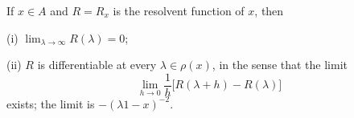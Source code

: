 If $x \in A$ and $R = R_x$ is the resolvent function of $x$, then

(i) $\displaystyle\lim_{\lambda \to \infty} R(\lambda) = 0$;

(ii) $R$ is differentiable at every $\lambda \in \rho(x)$, in the sense that the limit
$$\lim_{h \to 0} \frac{1}{h}\bigl[R(\lambda + h) - R(\lambda)\bigr]$$
exists; the limit is $-(\lambda 1 - x)^{-2}$.

